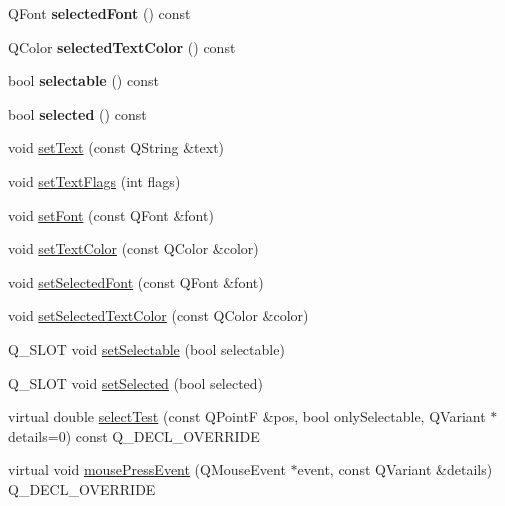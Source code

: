 \begin{DoxyCompactItemize}
Q\+Font {\bfseries selected\+Font} () const
\item 
\mbox{\label{class_q_c_p_text_element_a98616fa5c33f1eaee0428191ece39686}} 
Q\+Color {\bfseries selected\+Text\+Color} () const
\item 
\mbox{\label{class_q_c_p_text_element_a96e2a712fca40324a8489f75833b4096}} 
bool {\bfseries selectable} () const
\item 
\mbox{\label{class_q_c_p_text_element_a135d1ad0aa97a245b4247c3292ff551c}} 
bool {\bfseries selected} () const
\item 
void \hyperlink{class_q_c_p_text_element_ac44b81e69e719b879eb2feecb33557e2}{set\+Text} (const Q\+String \&text)
\item 
void \hyperlink{class_q_c_p_text_element_ab908f437f552020888a3ad8cf8242605}{set\+Text\+Flags} (int flags)
\item 
void \hyperlink{class_q_c_p_text_element_a09b3241769528fa87cb4bf35c97defad}{set\+Font} (const Q\+Font \&font)
\item 
void \hyperlink{class_q_c_p_text_element_a4f3b8361c3ffb3f84346954929ce93ba}{set\+Text\+Color} (const Q\+Color \&color)
\item 
void \hyperlink{class_q_c_p_text_element_a0a2397a3c4ede519e16ab3e991904065}{set\+Selected\+Font} (const Q\+Font \&font)
\item 
void \hyperlink{class_q_c_p_text_element_abaec200cae70a0eade53583defc0476d}{set\+Selected\+Text\+Color} (const Q\+Color \&color)
\item 
Q\+\_\+\+S\+L\+OT void \hyperlink{class_q_c_p_text_element_a3c5f9b1897a036b16495ed3fb8371c55}{set\+Selectable} (bool selectable)
\item 
Q\+\_\+\+S\+L\+OT void \hyperlink{class_q_c_p_text_element_aba5521f9fb22a5f3d2f09ab37d4a1751}{set\+Selected} (bool selected)
\item 
virtual double \hyperlink{class_q_c_p_text_element_a1e721bc2994a127ef5a8f0a514a5dbac}{select\+Test} (const Q\+PointF \&pos, bool only\+Selectable, Q\+Variant $\ast$details=0) const Q\+\_\+\+D\+E\+C\+L\+\_\+\+O\+V\+E\+R\+R\+I\+DE
\item 
virtual void \hyperlink{class_q_c_p_text_element_ad7b2c98355e3d2f912574b74fcee0574}{mouse\+Press\+Event} (Q\+Mouse\+Event $\ast$event, const Q\+Variant \&details) Q\+\_\+\+D\+E\+C\+L\+\_\+\+O\+V\+E\+R\+R\+I\+DE

\end{DoxyCompactItemize}
